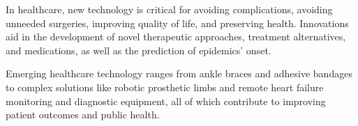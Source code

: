 \documentclass{article}
\begin{document}
In healthcare, new technology is critical for avoiding complications, avoiding unneeded surgeries, improving quality of life, and preserving health.
Innovations aid in the development of novel therapeutic approaches, treatment alternatives, and medications, as well as the prediction of epidemics' onset.


Emerging healthcare technology ranges from ankle braces and adhesive bandages to complex solutions like robotic prosthetic limbs and remote heart failure monitoring and diagnostic equipment, all of which contribute to improving patient outcomes and public health.
%
%
\end{document}
